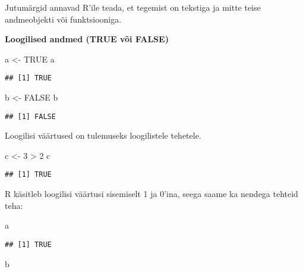 \documentclass[
]{book}
\newenvironment{Shaded}{\begin{snugshade}}{\end{snugshade}}
\newcommand{\ConstantTok}[1]{\textcolor[rgb]{0.00,0.00,0.00}{#1}}
\newcommand{\DecValTok}[1]{\textcolor[rgb]{0.00,0.00,0.81}{#1}}
\newcommand{\NormalTok}[1]{#1}
\newcommand{\OtherTok}[1]{\textcolor[rgb]{0.56,0.35,0.01}{#1}}
\newcommand{\SpecialCharTok}[1]{\textcolor[rgb]{0.00,0.00,0.00}{#1}}
\begin{document}
Jutumärgid annavad R'ile teada, et tegemist on tekstiga ja mitte teise andmeobjekti või funktsiooniga.

\textbf{Loogilised andmed (TRUE või FALSE)}

\begin{Shaded}
\begin{Highlighting}[]
\NormalTok{a }\OtherTok{\textless{}{-}} \ConstantTok{TRUE}
\NormalTok{a}
\end{Highlighting}
\end{Shaded}

\begin{verbatim}
## [1] TRUE
\end{verbatim}

\begin{Shaded}
\begin{Highlighting}[]
\NormalTok{b }\OtherTok{\textless{}{-}} \ConstantTok{FALSE}
\NormalTok{b}
\end{Highlighting}
\end{Shaded}

\begin{verbatim}
## [1] FALSE
\end{verbatim}

Loogilisi väärtused on tulemuseks loogilistele tehetele.

\begin{Shaded}
\begin{Highlighting}[]
\NormalTok{c }\OtherTok{\textless{}{-}} \DecValTok{3} \SpecialCharTok{\textgreater{}} \DecValTok{2}
\NormalTok{c}
\end{Highlighting}
\end{Shaded}

\begin{verbatim}
## [1] TRUE
\end{verbatim}

R käsitleb loogilisi väärtusi sisemiselt 1 ja 0'ina, seega saame ka nendega tehteid teha:

\begin{Shaded}
\begin{Highlighting}[]
\NormalTok{a}
\end{Highlighting}
\end{Shaded}

\begin{verbatim}
## [1] TRUE
\end{verbatim}

\begin{Shaded}
\begin{Highlighting}[]
\NormalTok{b}
\end{Highlighting}
\end{Shaded}
\end{document}

